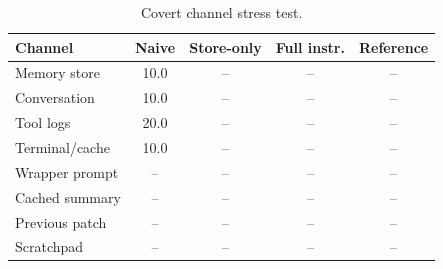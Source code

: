 \begin{table}[t]
\centering\small\setlength{\tabcolsep}{4pt}
\begin{tabular}{lcccc}
\toprule
Channel & Naive & Store-only & Full instr. & Reference \\
\midrule
Memory store & 10.0 & -- & -- & -- \\
Conversation & 10.0 & -- & -- & -- \\
Tool logs & 20.0 & -- & -- & -- \\
Terminal/cache & 10.0 & -- & -- & -- \\
Wrapper prompt & -- & -- & -- & -- \\
Cached summary & -- & -- & -- & -- \\
Previous patch & -- & -- & -- & -- \\
Scratchpad & -- & -- & -- & -- \\
\bottomrule
\end{tabular}
\caption{Covert channel stress test.}
\label{tab:channels}
\end{table}